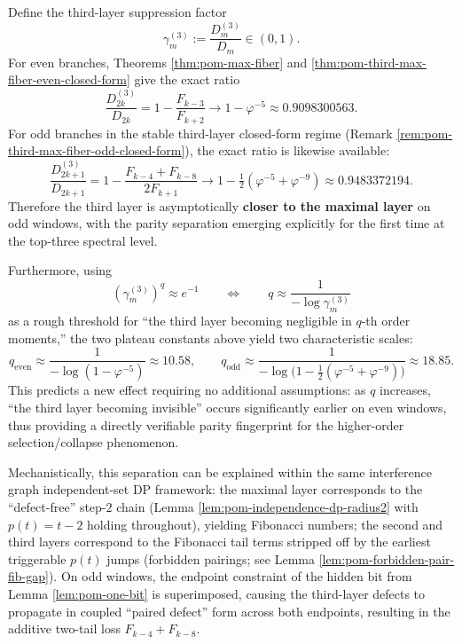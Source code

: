 \begin{remark}\label{rem:pom-third-max-gap-parity}
Define the third-layer suppression factor
\[
\gamma_m^{(3)}:=\frac{D_m^{(3)}}{D_m}\in(0,1).
\]
For even branches, Theorems \ref{thm:pom-max-fiber} and \ref{thm:pom-third-max-fiber-even-closed-form} give the exact ratio
\[
\frac{D_{2k}^{(3)}}{D_{2k}}
=1-\frac{F_{k-3}}{F_{k+2}}
\longrightarrow
1-\varphi^{-5}
\approx 0.9098300563.
\]
For odd branches in the stable third-layer closed-form regime (Remark \ref{rem:pom-third-max-fiber-odd-closed-form}), the exact ratio is likewise available:
\[
\frac{D_{2k+1}^{(3)}}{D_{2k+1}}
=1-\frac{F_{k-4}+F_{k-8}}{2F_{k+1}}
\longrightarrow
1-\tfrac12(\varphi^{-5}+\varphi^{-9})
\approx 0.9483372194.
\]
Therefore the third layer is asymptotically \textbf{closer to the maximal layer} on odd windows, with the parity separation emerging explicitly for the first time at the top-three spectral level.
\par
Furthermore, using
\[
\left(\gamma_m^{(3)}\right)^q\approx e^{-1}
\qquad\Longleftrightarrow\qquad
q\approx \frac{1}{-\log \gamma_m^{(3)}}
\]
as a rough threshold for ``the third layer becoming negligible in \(q\)-th order moments,'' the two plateau constants above yield two characteristic scales:
\[
q_{\mathrm{even}}\approx \frac{1}{-\log(1-\varphi^{-5})}\approx 10.58,
\qquad
q_{\mathrm{odd}}\approx \frac{1}{-\log\bigl(1-\tfrac12(\varphi^{-5}+\varphi^{-9})\bigr)}\approx 18.85.
\]
This predicts a new effect requiring no additional assumptions: as \(q\) increases, ``the third layer becoming invisible'' occurs significantly earlier on even windows, thus providing a directly verifiable parity fingerprint for the higher-order selection/collapse phenomenon.
\par
Mechanistically, this separation can be explained within the same interference graph independent-set DP framework: the maximal layer corresponds to the ``defect-free'' step-\(2\) chain (Lemma \ref{lem:pom-independence-dp-radius2} with \(p(t)=t-2\) holding throughout), yielding Fibonacci numbers; the second and third layers correspond to the Fibonacci tail terms stripped off by the earliest triggerable \(p(t)\) jumps (forbidden pairings; see Lemma \ref{lem:pom-forbidden-pair-fib-gap}).
On odd windows, the endpoint constraint of the hidden bit from Lemma \ref{lem:pom-one-bit} is superimposed, causing the third-layer defects to propagate in coupled ``paired defect'' form across both endpoints, resulting in the additive two-tail loss \(F_{k-4}+F_{k-8}\).
\end{remark}

